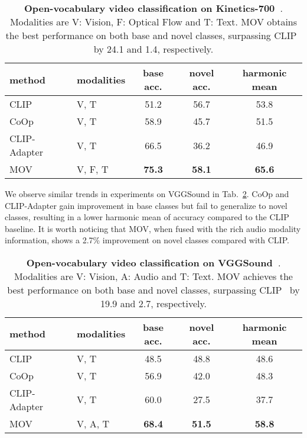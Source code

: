 \documentclass{article}
\begin{document}
\begin{table}[t]
\begin{tabular}{llccc}
    \toprule 
    method & modalities & base acc. & novel acc. & harmonic mean      \\
    \midrule 
    CLIP~\cite{radford2021learning} & V, T & 51.2 & 56.7 & 53.8 \\
    CoOp~\cite{zhou2021coop} & V, T & 58.9 & 45.7 & 51.5 \\
    CLIP-Adapter~\cite{gao2021clip} & V, T & 66.5 & 36.2 & 46.9 \\
    MOV & V, F, T & \textbf{75.3} & \textbf{58.1} & \textbf{65.6}\\
    \bottomrule 
\end{tabular}
\caption{\textbf{Open-vocabulary video classification on Kinetics-700~\cite{carreira2019short}}. Modalities are V: Vision, F: Optical Flow and T: Text. MOV obtains the best performance on both base and novel classes, surpassing CLIP~\cite{radford2021learning} by 24.1 and 1.4, respectively.}
\label{tab:exp_kinetics700}
\end{table}

We observe similar trends in experiments on VGGSound in Tab.~\ref{tab:exp_vggsound}. 
CoOp and CLIP-Adapter gain improvement in base classes but fail to generalize to novel classes, resulting in a lower harmonic mean of accuracy compared to the CLIP baseline.
It is worth noticing that MOV, when fused with the rich audio modality information, shows a 2.7\% improvement on novel classes compared with CLIP. 

\begin{table}[t]
\begin{tabular}{llccc}
    \toprule 
    method & modalities & base acc. & novel acc. & harmonic mean  \\
    \midrule 
    CLIP~\cite{radford2021learning} & V, T & 48.5 & 48.8 & 48.6 \\
    CoOp~\cite{zhou2021coop} & V, T & 56.9 & 42.0 & 48.3 \\
    CLIP-Adapter~\cite{gao2021clip} & V, T & 60.0 & 27.5 & 37.7 \\
    MOV & V, A, T & \textbf{68.4} & \textbf{51.5} & \textbf{58.8} \\
    \bottomrule 
\end{tabular}
\caption{\textbf{Open-vocabulary video classification on VGGSound~\cite{chen2020vggsound}}. Modalities are V: Vision, A: Audio and T: Text. MOV achieves the best performance on both base and novel classes, surpassing CLIP~\cite{radford2021learning} by 19.9 and 2.7, respectively. }
\label{tab:exp_vggsound}
\end{table}
\end{document}
